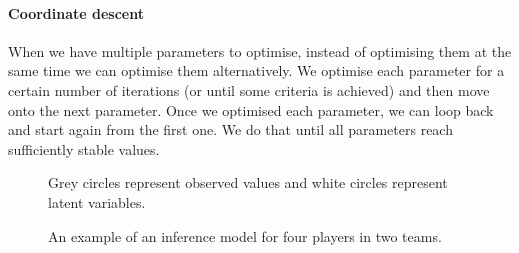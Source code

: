 \documentclass[12pt,a4paper]{book}
\newcommand\bs[1]{\boldsymbol{#1}}
\newcommand\note[1]{\vspace*{-0.5\baselineskip}\caption*{#1}}
\begin{document}
\paragraph{Coordinate descent}
When we have multiple parameters to optimise, instead of optimising them at the same time we can optimise them alternatively.
We optimise each parameter for a certain number of iterations (or until some criteria is achieved) and then move onto the next parameter.
Once we optimised each parameter, we can loop back and start again from the first one.
We do that until all parameters reach sufficiently stable values.
\begin{figure}[ht]
\centering
{}
\caption{An example of an inference model for four players in two teams.}
\note{Grey circles represent observed values and white circles represent latent variables.}
\label{fig:four-player-model}
\end{figure}
\end{document}
